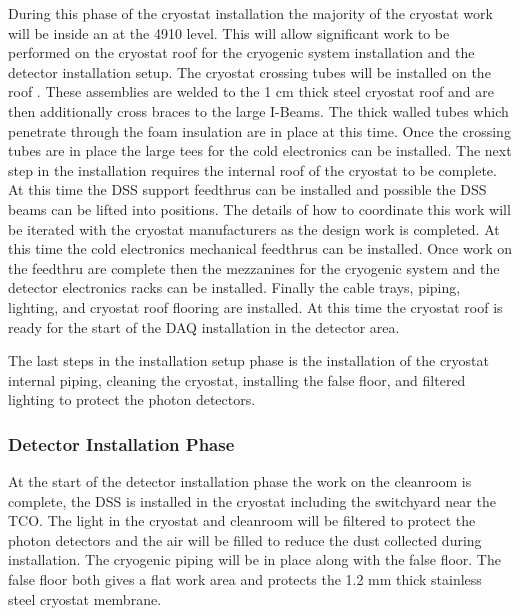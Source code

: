During this phase of the cryostat installation the majority of the cryostat work will be inside an at the 4910 level. 
This will allow significant work to be performed on the cryostat roof for the cryogenic system installation and the detector installation setup. 
The cryostat crossing tubes will be installed on the roof 
 . 
These assemblies are welded to the 1 \si{cm} thick steel cryostat roof and are then additionally cross braces to the large I-Beams. 
The thick walled tubes which penetrate through the foam insulation are in place at this time. 
Once the crossing tubes are in place the large tees for the cold electronics can be installed. 
The next step in the installation requires the internal roof of the cryostat to be complete. 
At this time the DSS support feedthrus can be installed and possible the DSS beams can be lifted into positions. 
The details of how to coordinate this work will be iterated with the cryostat manufacturers as the design work is completed. 
At this time the cold electronics mechanical feedthrus can be installed. 
Once work on the feedthru are complete then the mezzanines for the cryogenic system and the detector electronics racks can be installed.
Finally the cable trays,  piping, lighting, and cryostat roof flooring are installed. 
At this time the cryostat roof is ready for the start of the DAQ installation in the detector area.

The last steps in the installation setup phase is the installation of the cryostat internal piping, cleaning the cryostat, installing the false floor, and filtered lighting to protect the photon detectors. 



\subsubsection{Detector Installation Phase}

At the start of the detector installation phase the work on the cleanroom is complete, the DSS is installed in the cryostat including the switchyard near the TCO. 
The light in the cryostat and cleanroom will be filtered to protect the photon detectors and the air will be filled to reduce the dust collected during installation. 
The cryogenic piping will be in place along with the false floor. 
The false floor both gives a flat work area and protects the 1.2 \si{mm} thick stainless steel cryostat membrane. 



